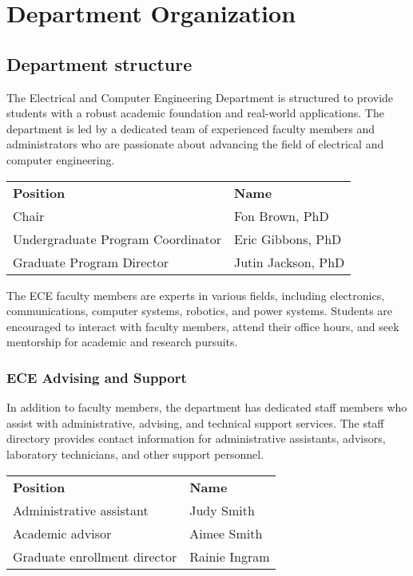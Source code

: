 
\chapter{Department Organization}
\label{cha:departm-organ}

\section{Department structure}
\label{sec:department-structure}

The Electrical and Computer Engineering Department is structured to provide students with a robust academic foundation and real-world applications. The department is led by a dedicated team of experienced faculty members and administrators who are passionate about advancing the field of electrical and computer engineering.
\begin{flushleft}
\begin{tabular}{p{8cm}p{6cm}}
\textbf{Position} & \textbf{Name} \\
Chair & Fon Brown, PhD \\
Undergraduate Program Coordinator & Eric Gibbons, PhD \\
Graduate Program Director & Jutin Jackson, PhD \\
\end{tabular}
\end{flushleft}

The ECE faculty members are experts in various fields, including electronics, communications, computer systems, robotics, and power systems. Students are encouraged to interact with faculty members, attend their office hours, and seek mentorship for academic and research pursuits.

\subsection{ECE Advising and Support}
\label{sec:ece-faculty-direct}


In addition to faculty members, the department has dedicated staff members who assist with administrative, advising, and technical support services. The staff directory provides contact information for administrative assistants, advisors, laboratory technicians, and other support personnel.

\begin{flushleft}
\begin{tabular}{p{8cm}p{6cm}}
\textbf{Position} & \textbf{Name} \\
Administrative assistant & Judy Smith \\
Academic advisor & Aimee Smith \\
Graduate enrollment director & Rainie Ingram \\
\end{tabular}
\end{flushleft}


